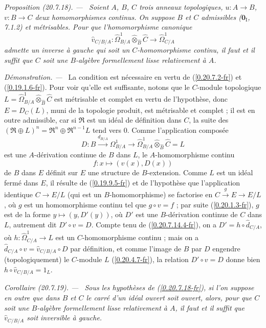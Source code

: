 \documentclass[10pt,oneside]{book}
\makeatletter
\newcommand{\sref}[1]{(\ref{#1})}
\newcommand{\setmanualcurrentlabel}[1]{\def\@currentlabel{#1}}
\newcommand{\oldpage}[2][]{%
  \setcounter{footnote}{0}%
  \marginpar{\scriptsize\textbf{#1}~|~#2}\ignorespaces}
\newenvironment{proposition}[1][]{%
  \setmanualcurrentlabel{#1}\par\medskip\noindent\itshape Proposition (#1). ---\ }{\par}
\newenvironment{corollary}[1][]{%
  \setmanualcurrentlabel{#1}\par\medskip\noindent\itshape Corollaire (#1). ---\ }{\par}
\newenvironment{proof}{%
  \par\medskip\noindent\textit{Démonstration. ---\ }}{\par}
\makeatother
\begin{document}
\begin{proposition}[20.7.18]
\label{0.20.7.18-fr}
Soient $A$, $B$, $C$ trois anneaux topologiques, $u:A\to B$, $v:B\to C$
deux homomorphismes continus. On suppose $B$ et $C$ admissibles
($\mathbf{0}_{\mathrm I}$, 7.1.2) et métrisables. Pour que l'homomorphisme
canonique
\[
  \widehat v_{C/B/A}:\widehat{\Omega}^1_{B/A}
  \widehat\otimes_{\widehat B}\widehat C\to\widehat{\Omega}^1_{C/A}
\]
admette un inverse à gauche qui soit un $C$-homomorphisme continu, il faut et
il suffit que $C$ soit une $B$-algèbre formellement lisse relativement à $A$.
\end{proposition}

\begin{proof}
La condition est nécessaire en vertu de \sref{0.20.7.2-fr} et
\sref{0.19.1.6-fr}. Pour voir qu'elle est suffisante, notons que le $C$-module
topologique
$L=\widehat{\Omega}^1_{B/A}\widehat\otimes_{\widehat B}\widehat C$ est
métrisable et
\oldpage[0\textsubscript{IV-1}]{153}
complet en vertu de l'hypothèse, donc $E=D_C(L)$, muni de la topologie produit,
est métrisable et complet ; il est en outre admissible, car si $\mathfrak{R}$
est un idéal de définition dans $C$, la suite des
$(\mathfrak{R}\oplus L)^n=\mathfrak{R}^n\oplus\mathfrak{R}^{n-1}L$ tend vers
$0$. Comme l'application composée
\[
  D:B\xrightarrow{d_{B/A}}\Omega^1_{B/A}\to
  \widehat{\Omega}^1_{B/A}\widehat\otimes_{\widehat B}\widehat C=L
\]
est une $A$-dérivation continue de $B$ dans $L$, le $A$-homomorphisme continu
\[
  f:x\longmapsto(v(x),D(x))
\]
de $B$ dans $E$ définit sur $E$ une structure de $B$-extension. Comme $L$ est
un idéal fermé dans $E$, il résulte de \sref{0.19.9.5-fr} et de l'hypothèse
que l'application identique $C\to E/L$ (qui est un $B$-homomorphisme) se
factorise en $C\xrightarrow{g}E\to E/L$, où $g$ est un homomorphisme continu
tel que $g\circ v=f$ ; par suite \sref{0.20.1.3-fr}, $g$ est de la forme
$y\mapsto(y,D'(y))$, où $D'$ est une $B$-dérivation continue de $C$ dans $L$,
autrement dit $D'\circ v=D$. Compte tenu de \sref{0.20.7.14.4-fr}, on a
$D'=h\circ\widehat d_{C/A}$, où
$h:\widehat{\Omega}^1_{C/A}\to L$ est un $C$-homomorphisme continu ; mais on
a $\widehat d_{C/A}\circ v=\widehat v_{C/B/A}\circ D$ par définition, et
comme l'image de $B$ par $D$ engendre (topologiquement) le $C$-module $L$
\sref{0.20.4.7-fr}, la relation $D'\circ v=D$ donne bien
$h\circ\widehat v_{C/B/A}=1_L$.
\end{proof}

\begin{corollary}[20.7.19]
\label{0.20.7.19-fr}
Sous les hypothèses de \sref{0.20.7.18-fr}, si l'on suppose en outre que dans
$B$ et $C$ le carré d'un idéal ouvert soit ouvert, alors, pour que $C$ soit
une $B$-algèbre formellement lisse relativement à $A$, il faut et il suffit
que $\widehat v_{C/B/A}$ soit inversible à gauche.
\end{corollary}
\end{document}
